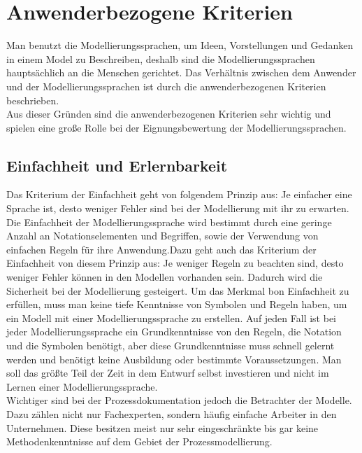 \section{Anwenderbezogene Kriterien}
\label{sc:AnwenderbezogeneKriterien}
Man benutzt die Modellierungssprachen, um Ideen, Vorstellungen und Gedanken in einem Model zu Beschreiben, deshalb sind die Modellierungssprachen hauptsächlich an die Menschen gerichtet.
Das Verhältnis zwischen dem Anwender und der Modellierungssprachen ist durch die anwenderbezogenen Kriterien beschrieben.\\
Aus dieser Gründen sind die anwenderbezogenen Kriterien sehr wichtig und spielen eine große Rolle bei der Eignungsbewertung der Modellierungssprachen.   
\subsection{Einfachheit und Erlernbarkeit}
\label{sc:Einfachheit}
Das Kriterium der Einfachheit geht von folgendem Prinzip aus: Je einfacher eine Sprache ist, desto weniger Fehler sind bei der Modellierung mit ihr zu erwarten. Die Einfachheit der Modellierungssprache wird bestimmt durch eine geringe Anzahl an Notationselementen und Begriffen, sowie der Verwendung von einfachen Regeln für ihre Anwendung\cite{MT014}.Dazu geht auch das Kriterium der Einfachheit von diesem Prinzip aus: Je weniger Regeln zu beachten sind, desto weniger Fehler können in den Modellen vorhanden sein. Dadurch
wird die Sicherheit bei der Modellierung gesteigert\cite{MT006}.
Um das Merkmal bon Einfachheit zu erfüllen, muss man keine tiefe Kenntnisse von Symbolen und Regeln haben, um ein Modell mit einer Modellierungssprache zu erstellen. Auf jeden Fall ist bei jeder Modellierungssprache ein Grundkenntnisse von den Regeln, die Notation und die Symbolen benötigt, aber diese Grundkenntnisse muss schnell gelernt werden und benötigt keine Ausbildung oder bestimmte Voraussetzungen. Man soll das größte Teil der Zeit in dem Entwurf selbst investieren und nicht im Lernen einer Modellierungssprache. \\
Wichtiger sind bei der Prozessdokumentation jedoch die Betrachter der Modelle. Dazu zählen nicht nur Fachexperten, sondern häufig einfache Arbeiter in den Unternehmen. Diese besitzen meist nur sehr eingeschränkte bis gar keine Methodenkenntnisse auf dem Gebiet der Prozessmodellierung\cite{MT007}.



